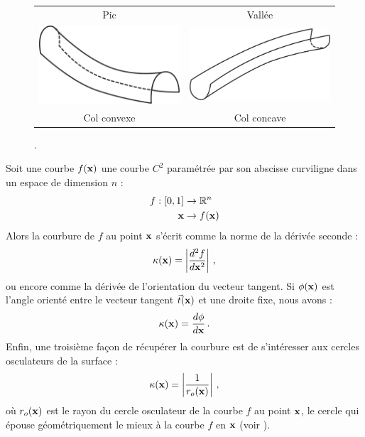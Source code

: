\begin{figure}[ht]
\begin{center}
\begin{tabular}{cc}
      \\
      Pic &
      Vallée
      \\
      \includegraphics[width=5.5cm]{figures/curv_col_conv} &
      \includegraphics[width=5.5cm]{figures/curv_col_conc}
      \\
      Col convexe &
      Col concave
    \end{tabular}
    \caption[]{.\label{fig:curvature-figures}}
  \end{center}
\end{figure}


%
%
Soit une courbe $f(\mathbf{x})$ une courbe $C^2$ paramétrée par son abscisse curviligne
dans un espace de dimension $n$ :
%
\begin{align}
    f : [0,1] &\rightarrow \mathbb{R}^n \nonumber\\
    \mathbf{x} &\rightarrow f(\mathbf{x})
\end{align}
%
Alors la courbure de $f$ au point $\mathbf{x}$ s'écrit comme la norme de la dérivée
seconde :
%
\begin{equation}
  \kappa(\mathbf{x}) = \left| \frac{d^2f}{d\mathbf{x}^2} \right| \,,
\end{equation}
%
ou encore comme la dérivée de l'orientation du vecteur tangent. Si $\phi(\mathbf{x})$
est l'angle orienté entre le vecteur tangent $\vec{t}(\mathbf{x})$ et une droite fixe, nous avons :
%
\begin{equation}
  \kappa(\mathbf{x}) = \frac{d\phi}{d\mathbf{x}} \,.
\end{equation}
%
Enfin, une troisième façon de récupérer la courbure est de s'intéresser aux
cercles osculateurs de la surface :
%
\begin{equation}
  \kappa(\mathbf{x}) = \left| \frac{1}{r_o(\mathbf{x})} \right| \,,
\end{equation}
%
où $r_o(\mathbf{x})$ est le rayon du cercle osculateur de la courbe $f$ au point $\mathbf{x}$,
\cad le cercle qui épouse géométriquement le mieux à la courbe $f$ en
$\mathbf{x}$ (voir ).


